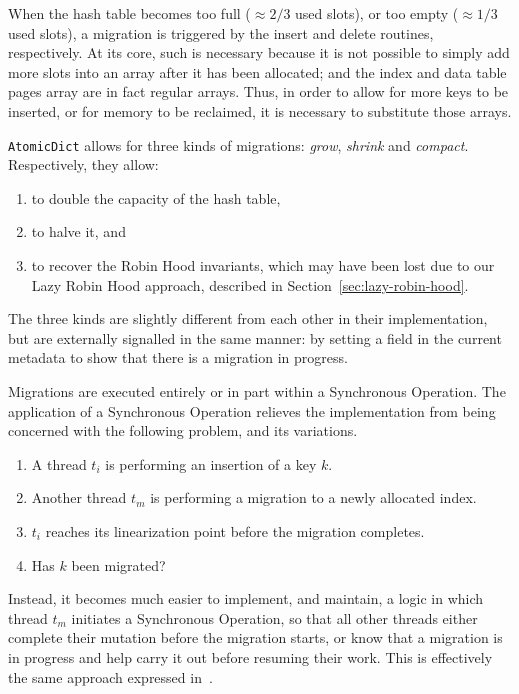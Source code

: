 When the hash table becomes too full ($\approx 2/3$ used slots), or too empty ($\approx 1/3$ used slots), a migration is triggered by the insert and delete routines, respectively.
At its core, such is necessary because it is not possible to simply add more slots into an array after it has been allocated; and the index and data table pages array are in fact regular arrays.
Thus, in order to allow for more keys to be inserted, or for memory to be reclaimed, it is necessary to substitute those arrays.

\texttt{AtomicDict} allows for three kinds of migrations: \emph{grow}, \emph{shrink} and \emph{compact}.
Respectively, they allow:
\begin{enumerate}
    \item to double the capacity of the hash table,
    \item to halve it, and
    \item to recover the Robin Hood invariants, which may have been lost due to our Lazy Robin Hood approach, described in Section~\ref{sec:lazy-robin-hood}.
\end{enumerate}
The three kinds are slightly different from each other in their implementation, but are externally signalled in the same manner: by setting a field in the current metadata to show that there is a migration in progress.

Migrations are executed entirely or in part within a Synchronous Operation.
The application of a Synchronous Operation relieves the implementation from being concerned with the following problem, and its variations.
\begin{enumerate}
    \item A thread $t_i$ is performing an insertion of a key $k$.
    \item Another thread $t_m$ is performing a migration to a newly allocated index.
    \item $t_i$ reaches its linearization point before the migration completes.
    \item Has $k$ been migrated?
\end{enumerate}
Instead, it becomes much easier to implement, and maintain, a logic in which thread $t_m$ initiates a Synchronous Operation, so that all other threads either complete their mutation before the migration starts, or know that a migration is in progress and help carry it out before resuming their work.
This is effectively the same approach expressed in~\cite[\S5.3.2, Preventing Concurrent Updates to Ensure Consistency]{maier}.

